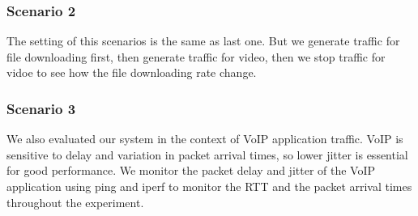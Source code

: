 \subsubsection{Scenario 2}
The setting of this scenarios is the same as last one. But we generate traffic for file downloading first, then generate traffic for video, then we stop traffic for vidoe to see how the file downloading rate change.

\subsubsection{Scenario 3}
We also evaluated our system in the context of VoIP application traffic. VoIP is sensitive to delay and variation in packet arrival times, so lower jitter is essential for good performance. We monitor the packet delay and jitter of the
VoIP application using ping and iperf to monitor the RTT and the packet arrival times throughout the experiment.




